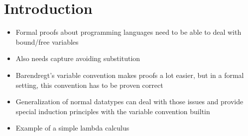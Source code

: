 \chapter{Introduction}\label{chapter:introduction}

\begin{itemize}
\item{Formal proofs about programming languages need to be able to deal with bound/free variables}
\item{Also needs capture avoiding substitution}
\item{Barendregt's variable convention makes proofs a lot easier, but in a formal setting, this convention has to be proven correct}
\item{Generalization of normal datatypes can deal with those issues and provide special induction principles with the variable convention builtin}
\item{Example of a simple lambda calculus}
\end{itemize}
